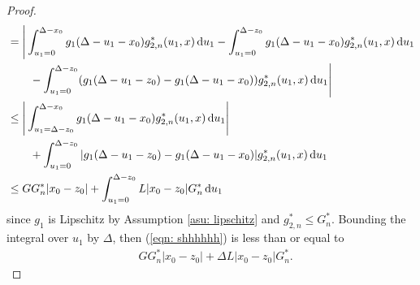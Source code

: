 \begin{proof}
\begin{align}
		\nonumber &{} = \Bigg|\int_{u_1=0}^{\Delta-x_0}g_1(\Delta - u_1 - x_0)g^*_{2,n}(u_1,x)\, \mathrm{d} u_1 - \int_{u_1=0}^{\Delta-z_0}g_1(\Delta - u_1 - x_0)g^*_{2,n}(u_1,x)\, \mathrm{d} u_1
		\\\nonumber &\qquad{} - \int_{u_1=0}^{\Delta-z_0}(g_1(\Delta - u_1 - z_0)-g_1(\Delta - u_1 - x_0))g^*_{2,n}(u_1,x)\, \mathrm{d} u_1\Bigg|
		\\\nonumber& \leq  \Bigg|\int_{u_1=\Delta-z_0}^{\Delta-x_0}g_1(\Delta - u_1 - x_0)g^*_{2,n}(u_1,x)\, \mathrm{d} u_1\Bigg|
		\\\nonumber &\qquad{} + \int_{u_1=0}^{\Delta-z_0}|g_1(\Delta - u_1 - z_0)-g_1(\Delta - u_1 - x_0)|g^*_{2,n}(u_1,x)\, \mathrm{d} u_1
		\\\label{eqn: shhhhhh}& \leq  GG^*_n|x_0-z_0|
		 + \int_{u_1=0}^{\Delta-z_0}L|x_0-z_0|G^*_n\, \mathrm{d} u_1
		 \end{align}
		{since \(g_1\) is Lipschitz by Assumption \ref{asu: lipschitz} and \(g_{2,n}^*\leq G_n^*\). Bounding the integral over \(u_1\) by \(\Delta\), then (\ref{eqn: shhhhhh}) is less than or equal to}
		\begin{align}
		&GG^*_n|x_0-z_0| + \Delta L|x_0-z_0|G^*_n.
	\end{align}
\end{proof}

